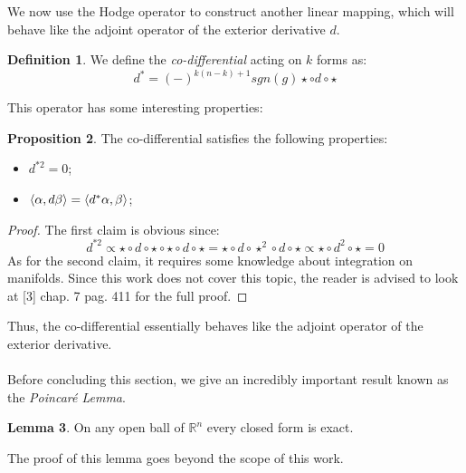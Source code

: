 \documentclass[12pt,a4paper]{report}
\theoremstyle{definition}
\newtheorem{Def}{Definition}[chapter]
\theoremstyle{Theorem}
\newtheorem{Prop}[Def]{Proposition}
\newtheorem{Lm}[Def]{Lemma}
\theoremstyle{definition}
\theoremstyle{definition}
\begin{document}
	We now use the Hodge operator to construct another linear mapping, which will behave like the adjoint operator of the exterior derivative $d$.
	\begin{Def}
		We define the \textit{co-differential} acting on $k$ forms as:
		$$d^*=(-)^{k(n-k)+1}sgn(g)\star \circ  d\circ\star$$
	\end{Def}
	This operator has some interesting properties:
	\begin{Prop}
		The co-differential satisfies the following properties:
		\begin{itemize}
			\item $d^{*2}=0$;
			\item $\braket{\alpha,d\beta}=\braket{d^*\alpha,\beta}$;
		\end{itemize}
	\end{Prop}
	\begin{proof}
		The first claim is obvious since:
		$$d^{*2}\propto\star \circ  d\circ\star\circ\star \circ  d\circ\star=\star \circ  d\circ\star^2\circ  d\circ\star\propto\star\circ d^2\circ\star=0$$
		As for the second claim, it requires some knowledge about integration on manifolds. Since this work does not cover this topic, the reader is advised to look at [3] chap. 7 pag. 411 for the full proof.
	\end{proof}
	Thus, the co-differential essentially behaves like the adjoint operator of the exterior derivative.\\
	\\
	Before concluding this section, we give an incredibly important result known as the \textit{Poincaré Lemma}.
	\begin{Lm}\label{P.L.}
		On any open ball of $\mathbb{R}^n$ every closed form is exact.
	\end{Lm}
	The proof of this lemma goes beyond the scope of this work.
\end{document}
